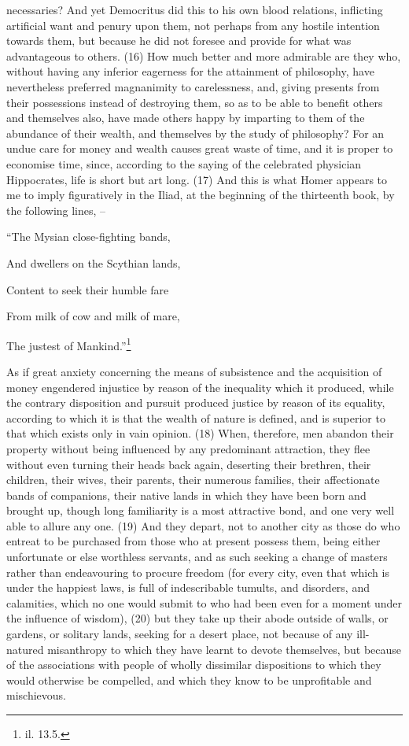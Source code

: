necessaries? And yet Democritus did this to his own blood relations, inflicting artificial want and
penury upon them, not perhaps from any hostile intention towards them, but because he did not
foresee and provide for what was advantageous to others. (16) How much better and more
admirable are they who, without having any inferior eagerness for the attainment of philosophy,
have nevertheless preferred magnanimity to carelessness, and, giving presents from their
possessions instead of destroying them, so as to be able to benefit others and themselves also,
have made others happy by imparting to them of the abundance of their wealth, and themselves by
the study of philosophy? For an undue care for money and wealth causes great waste of time, and
it is proper to economise time, since, according to the saying of the celebrated physician
Hippocrates, life is short but art long. (17) And this is what Homer appears to me to imply
figuratively in the Iliad, at the beginning of the thirteenth book, by the following lines, --

``The Mysian close-fighting bands,

And dwellers on the Scythian lands,

Content to seek their humble fare

From milk of cow and milk of mare,

The justest of Mankind.''\footnote{il. 13.5.}

As if great anxiety concerning the means of subsistence and the acquisition of money engendered
injustice by reason of the inequality which it produced, while the contrary disposition and pursuit
produced justice by reason of its equality, according to which it is that the wealth of nature is
defined, and is superior to that which exists only in vain opinion. (18) When, therefore, men
abandon their property without being influenced by any predominant attraction, they flee without
even turning their heads back again, deserting their brethren, their children, their wives, their
parents, their numerous families, their affectionate bands of companions, their native lands in
which they have been born and brought up, though long familiarity is a most attractive bond, and
one very well able to allure any one. (19) And they depart, not to another city as those do who
entreat to be purchased from those who at present possess them, being either unfortunate or else
worthless servants, and as such seeking a change of masters rather than endeavouring to
procure freedom (for every city, even that which is under the happiest laws, is full of indescribable
tumults, and disorders, and calamities, which no one would submit to who had been even for a
moment under the influence of wisdom), (20) but they take up their abode outside of walls, or
gardens, or solitary lands, seeking for a desert place, not because of any ill-natured misanthropy
to which they have learnt to devote themselves, but because of the associations with people of
wholly dissimilar dispositions to which they would otherwise be compelled, and which they know to
be unprofitable and mischievous.

